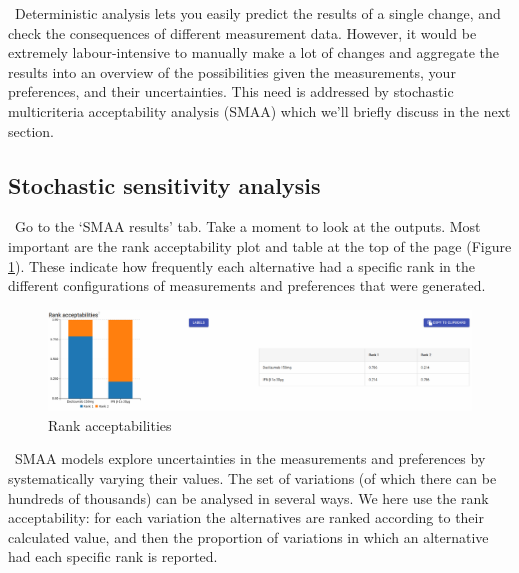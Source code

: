 \documentclass[00_mcda_tutorial.tex]{subfiles}
\begin{document}
\noindent \faGraduationCap \, Deterministic analysis lets you easily predict the results of a single change, and check the consequences of different measurement data. However, it would be extremely labour-intensive to manually make a lot of changes and aggregate the results into an overview of the possibilities given the measurements, your preferences, and their uncertainties. This need is addressed by stochastic multicriteria acceptability analysis (SMAA) which we’ll briefly discuss in the next section.

\subsection*{Stochastic sensitivity analysis}
\noindent \leftpointright \, Go to the ‘SMAA results’ tab. Take a moment to look at the outputs. Most important are the rank acceptability plot and table at the top of the page (Figure \ref{fig:rankAcceptabilities}). These indicate how frequently each alternative had a specific rank in the different configurations of measurements and preferences that were generated.
\newline

\begin{figure}[!h]
    \centering
	\includegraphics[width=\textwidth]{fig/rankAcceptabilities.png}
    \caption{Rank acceptabilities}
	\label{fig:rankAcceptabilities}
\end{figure}

\noindent \faGraduationCap \, SMAA models explore uncertainties in the measurements and preferences by systematically varying their values\footnotemark. The set of variations (of which there can be hundreds of thousands) can be analysed in several ways. We here use the rank acceptability: for each variation the alternatives are ranked according to their calculated value, and then the proportion of variations in which an alternative had each specific rank is reported.
\newline
\end{document}

